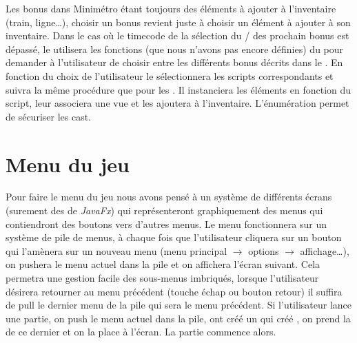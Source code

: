 \documentclass[report, backcover, french, nodocumentinfo]{upmethodology-document}
\begin{document}
				Les bonus dans Minimétro étant toujours des éléments à ajouter à l'inventaire (train, ligne\ldots), choisir un bonus revient juste à choisir un élément à ajouter à son inventaire. Dans le cas où le timecode de la sélection du / des prochain bonus est dépassé, le  utilisera les fonctions (que nous n'avons pas encore définies) du  pour demander à l'utilisateur de choisir entre les différents bonus décrits dans le . En fonction du choix de l'utilisateur le  sélectionnera les scripts correspondants et suivra la même procédure que pour les . Il instanciera les éléments en fonction du script, leur associera une vue et les ajoutera à l'inventaire. L'énumération  permet de sécuriser les cast.
		\section{Menu du jeu}
			Pour faire le menu du jeu nous avons pensé à un système de différents écrans (surement des  de \textit{JavaFx}) qui représenteront graphiquement des menus qui contiendront des boutons vers d'autres menus. Le menu fonctionnera sur un système de pile de menus, à chaque fois que l'utilisateur cliquera sur un bouton qui l'amènera sur un nouveau menu (menu principal $\rightarrow$ options $\rightarrow$ affichage\ldots), on pushera le menu actuel dans la pile et on affichera l'écran suivant. Cela permetra une gestion facile des sous-menus imbriqués, lorsque l'utilisateur désirera retourner au menu précédent (touche échap ou bouton retour) il suffira de pull le dernier menu de la pile qui sera le menu précédent. Si l'utilisateur lance une partie, on push le menu actuel dans la pile, ont créé un  qui créé , on prend la  de ce dernier et on la place à l'écran. La partie commence alors.
\end{document}
